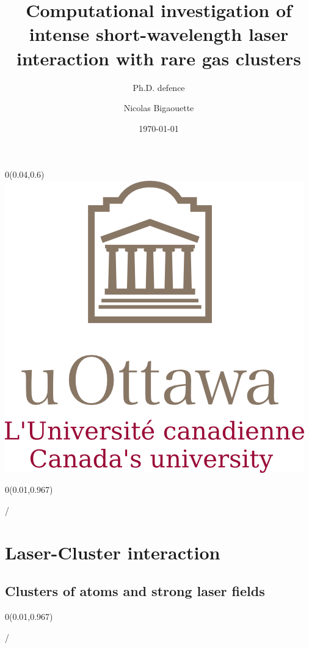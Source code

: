 \documentclass{beamer}
\title{Computational investigation of intense short-wavelength laser interaction with rare gas clusters}
\subtitle{Ph.D. defence}
\author{Nicolas Bigaouette}
\date[December 2013]{\today}
\institute{Computational Nanophotonics Group
\newline
Physics Department -- University of Ottawa}
\makeatletter
\newcommand{\framenumber}{
\begin{textblock}{0}(0.01,0.967)
\begin{scriptsize}
{\color{gray}\insertframenumber/\inserttotalframenumber}
\end{scriptsize}
\end{textblock}
}
\makeatother
\begin{document}
\begin{frame}{}
\titlepage
\begin{textblock}{0}(0.04,0.6)
\includegraphics[width=0.22\paperwidth]{figures/UofO}
\end{textblock}
\end{frame}

\begin{frame}\framenumber
\tableofcontents
\end{frame}


\section{Laser-Cluster interaction}

\subsection{Clusters of atoms and strong laser fields}
\begin{frame}{}\framenumber
\end{frame}
\end{document}
